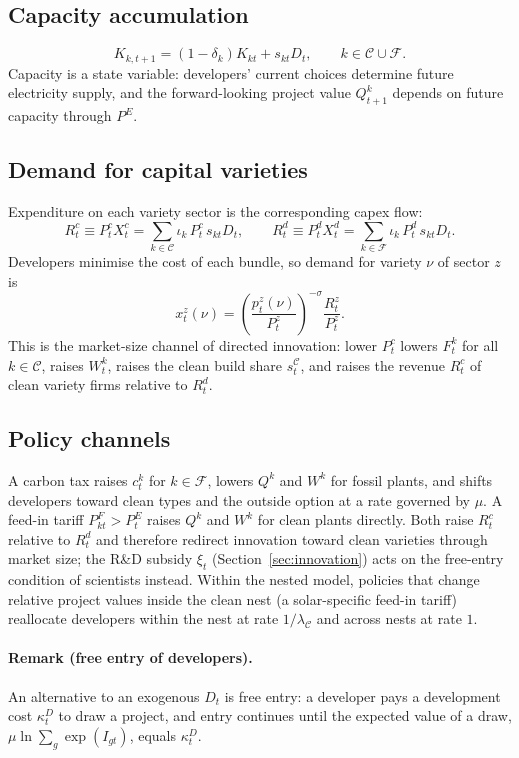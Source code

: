 \documentclass[12pt]{article}
\begin{document}
\subsection{Capacity accumulation}

\[
K_{k,t+1}=(1-\delta_k)K_{kt}+s_{kt}D_t,
\qquad k\in\mathcal C\cup\mathcal F .
\]
Capacity is a state variable: developers' current choices determine
future electricity supply, and the forward-looking project value
$Q^k_{t+1}$ depends on future capacity through $P^E$.

\subsection{Demand for capital varieties}

Expenditure on each variety sector is the corresponding capex flow:
\[
R^c_t\equiv P^c_tX^c_t=\sum_{k\in\mathcal C}\iota_k\,P^c_t\,s_{kt}D_t,
\qquad
R^d_t\equiv P^d_tX^d_t=\sum_{k\in\mathcal F}\iota_k\,P^d_t\,s_{kt}D_t.
\]
Developers minimise the cost of each bundle, so demand for variety $\nu$
of sector $z$ is
\[
x^z_t(\nu)=\left(\frac{p^z_t(\nu)}{P^z_t}\right)^{-\sigma}
\frac{R^z_t}{P^z_t} .
\]
This is the market-size channel of directed innovation: lower $P^c_t$
lowers $F^k_t$ for all $k\in\mathcal C$, raises $W^k_t$, raises the clean
build share $s^{\mathcal C}_t$, and raises the revenue $R^c_t$ of clean
variety firms relative to $R^d_t$.

\subsection{Policy channels}

A carbon tax raises $c^k_t$ for $k\in\mathcal F$, lowers $Q^k$ and $W^k$
for fossil plants, and shifts developers toward clean types and the
outside option at a rate governed by $\mu$. A feed-in tariff
$P^F_{kt}>P^E_t$ raises $Q^k$ and $W^k$ for clean plants directly. Both
raise $R^c_t$ relative to $R^d_t$ and therefore redirect innovation
toward clean varieties through market size; the R\&D subsidy $\xi_t$
(Section~\ref{sec:innovation}) acts on the free-entry condition of
scientists instead. Within the nested model, policies that change
relative project values inside the clean nest (a solar-specific feed-in
tariff) reallocate developers within the nest at rate
$1/\lambda_{\mathcal C}$ and across nests at rate $1$.

\paragraph{Remark (free entry of developers).}
An alternative to an exogenous $D_t$ is free entry: a developer pays a
development cost $\kappa^D_t$ to draw a project, and entry continues
until the expected value of a draw, $\mu\ln\sum_g\exp(I_{gt})$, equals
$\kappa^D_t$.
\end{document}
